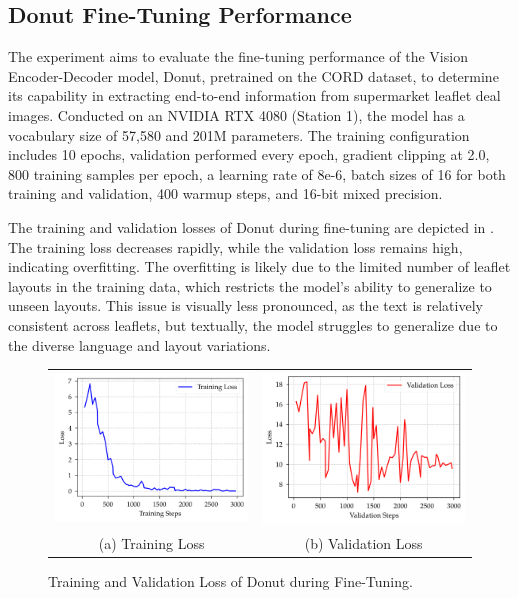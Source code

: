 \documentclass[11pt]{article}
\begin{document}
\subsection{Donut Fine-Tuning Performance}
The experiment aims to evaluate the fine-tuning performance of the Vision Encoder-Decoder model, Donut, pretrained on the CORD dataset, to determine its capability in extracting end-to-end information from supermarket leaflet deal images. Conducted on an NVIDIA RTX 4080 (Station 1), the model has a vocabulary size of 57,580 and 201M parameters. The training configuration includes 10 epochs, validation performed every epoch, gradient clipping at 2.0, 800 training samples per epoch, a learning rate of 8e-6, batch sizes of 16 for both training and validation, 400 warmup steps, and 16-bit mixed precision.

 The training and validation losses of Donut during fine-tuning are depicted in . The training loss decreases rapidly, while the validation loss remains high, indicating overfitting. The overfitting is likely due to the limited number of leaflet layouts in the training data, which restricts the model's ability to generalize to unseen layouts. This issue is visually less pronounced, as the text is relatively consistent across leaflets, but textually, the model struggles to generalize due to the diverse language and layout variations.

\begin{figure}[h!]
    \begin{tabular}{cc}
    \includegraphics[width=0.4\linewidth]{figures/donut_train_loss.png} &\includegraphics[width=0.4\linewidth]{figures/donut_val_loss.png} \\
    (a) Training Loss & (b) Validation Loss \\[6pt]
    \end{tabular}
    \caption{Training and Validation Loss of Donut during Fine-Tuning.}
    \label{fig:donut_loss}
\end{figure}
\end{document}

